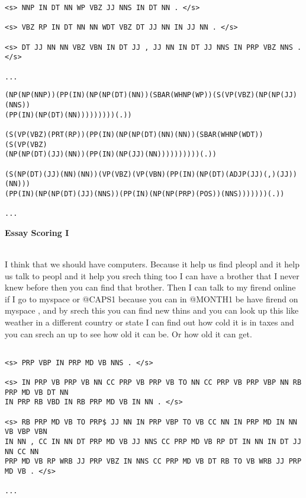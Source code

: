 \documentclass[11pt]{article}
\begin{document}
\begin{verbatim}
<s> NNP IN DT NN WP VBZ JJ NNS IN DT NN . </s>

<s> VBZ RP IN DT NN NN WDT VBZ DT JJ NN IN JJ NN . </s>

<s> DT JJ NN NN VBZ VBN IN DT JJ , JJ NN IN DT JJ NNS IN PRP VBZ NNS . </s>

...
\end{verbatim}

\begin{verbatim}
(NP(NP(NNP))(PP(IN)(NP(NP(DT)(NN))(SBAR(WHNP(WP))(S(VP(VBZ)(NP(NP(JJ)(NNS))
(PP(IN)(NP(DT)(NN)))))))))(.))

(S(VP(VBZ)(PRT(RP))(PP(IN)(NP(NP(DT)(NN)(NN))(SBAR(WHNP(WDT))(S(VP(VBZ)
(NP(NP(DT)(JJ)(NN))(PP(IN)(NP(JJ)(NN))))))))))(.))

(S(NP(DT)(JJ)(NN)(NN))(VP(VBZ)(VP(VBN)(PP(IN)(NP(DT)(ADJP(JJ)(,)(JJ))(NN)))
(PP(IN)(NP(NP(DT)(JJ)(NNS))(PP(IN)(NP(NP(PRP)(POS))(NNS)))))))(.))

...
\end{verbatim}

\newpage

\textbf{Essay Scoring I}

~\\

I think that we should have computers.  Because it help us find pleopl and it
help us talk to peopl and it help you srech thing too I can have a brother that
I never knew before then you can find that brother.  Then I can talk to my
firend online if I go to myspace or @CAPS1 because you can in @MONTH1 be have
firend on myspace , and by srech this you can find new thins and you can look up
this like weather in a different country or state I can find out how cold it is
in taxes and you can srech an up to see how old it can be.  Or how old it can
get.

\begin{verbatim}

<s> PRP VBP IN PRP MD VB NNS . </s>

<s> IN PRP VB PRP VB NN CC PRP VB PRP VB TO NN CC PRP VB PRP VBP NN RB PRP MD VB DT NN
IN PRP RB VBD IN RB PRP MD VB IN NN . </s>

<s> RB PRP MD VB TO PRP$ JJ NN IN PRP VBP TO VB CC NN IN PRP MD IN NN VB VBP VBN
IN NN , CC IN NN DT PRP MD VB JJ NNS CC PRP MD VB RP DT IN NN IN DT JJ NN CC NN
PRP MD VB RP WRB JJ PRP VBZ IN NNS CC PRP MD VB DT RB TO VB WRB JJ PRP MD VB . </s>

...
\end{verbatim}
\end{document}
